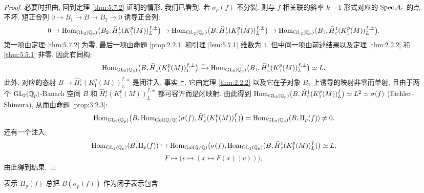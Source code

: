 \begin{proof}
必要时扭曲, 回到定理 \ref{thm:5.7.2} 证明的情形.
我们已看到, 若 $\sigma_p(f)$ 不分裂, 则与 $f$ 相关联的斜率 $k-1$ 形式对应的 $\operatorname{Spec} \mathcal{A}_c$ 的点不坏.
短正合列 $0 \to B_1 \to B \to B_2 \to 0$ 诱导正合列:
\[
0 \to \operatorname{Hom}_{\mathrm{GL}_2(\mathbb{Q}_p)}\bigl(B_2,\widehat{H}{}_{c}^{1}(K_1^{p}(M))_{L}^{f,\pm}\bigr)
\to \operatorname{Hom}_{\mathrm{GL}_2(\mathbb{Q}_p)}\bigl(B,\widehat{H}{}_{c}^{1}(K_1^{p}(M))_{L}^{f,\pm}\bigr)
\to \operatorname{Hom}_{\mathrm{GL}_2(\mathbb{Q}_p)}\bigl(B_1,\widehat{H}{}_{c}^{1}(K_1^{p}(M))_{L}^{f,\pm}\bigr).
\]
第一项由定理 \ref{thm:5.7.2} 为零, 最后一项由命题 \ref{prop:2.2.1} 和引理 \ref{lem:5.7.1} 维数为 $1$.
但中间一项由前述结果以及定理 \ref{thm:2.2.2} 和 \ref{thm:5.5.1} 非零.
因此有同构:
\[
\operatorname{Hom}_{\mathrm{GL}_2(\mathbb{Q}_p)}\bigl(B,\widehat{H}{}_{c}^{1}(K_1^{p}(M))_{L}^{f,\pm}\bigr) \xrightarrow{\sim} \operatorname{Hom}_{\mathrm{GL}_2(\mathbb{Q}_p)}\bigl(B_1,\widehat{H}{}_{c}^{1}(K_1^{p}(M))_{L}^{f,\pm}\bigr) \simeq L.
\]
此外, 对应的态射 $B \to \widehat{H}{}_{c}^{1}(K_1^{p}(M))_{L}^{f,\pm}$ 是闭注入.
事实上, 它由定理 \ref{thm:2.2.2} 以及它在子对象 $B_1$ 上诱导的映射非零而单射, 且由于两个 $\mathrm{GL}_2(\mathbb{Q}_p)$-Banach 空间 $B$ 和 $\widehat{H}{}_{c}^{1}(K_1^{p}(M))_{L}^{f,\pm}$ 都可容许而是闭映射.
由此得到 $\operatorname{Hom}_{\mathrm{GL}_2(\mathbb{Q}_p)}\bigl(B,\widehat{H}{}_{c}^{1}(K_1^{p}(M))_{L}^{f}\bigr) \simeq L^{2} \simeq \sigma(f)$ (Eichler--Shimura), 从而由命题 \ref{prop:3.2.3}:
\[
\operatorname{Hom}_{\mathrm{GL}_2(\mathbb{Q}_p)}\bigl(B,\operatorname{Hom}_{\operatorname{Gal}(\mathbb{Q}/\mathbb{Q})}(\sigma(f),\widehat{H}{}_{c}^{1}(K_1^{p}(M))_{L}^{f})\bigr)
= \operatorname{Hom}_{\mathrm{GL}_2(\mathbb{Q}_p)}(B,\Pi_p(f)) \neq 0.
\]
还有一个注入:
\[
\operatorname{Hom}_{\mathrm{GL}_2(\mathbb{Q}_p)}(B,\Pi_p(f)) \hookrightarrow \operatorname{Hom}_{\operatorname{Gal}(\mathbb{Q}/\mathbb{Q})}\bigl(\sigma(f),\operatorname{Hom}_{\mathrm{GL}_2(\mathbb{Q}_p)}(B,\widehat{H}{}_{c}^{1}(K_1^{p}(M))_{L}^{f})\bigr) \simeq L,
\]
\[
F \mapsto \bigl(v \mapsto (x \mapsto F(x)(v))\bigr),
\]
由此得到结果.
\end{proof}

\begin{corollary}\label{cor:5.7.4}
表示 $\Pi_p(f)$ 总把 $B(\sigma_p(f))$ 作为闭子表示包含.
\end{corollary}
